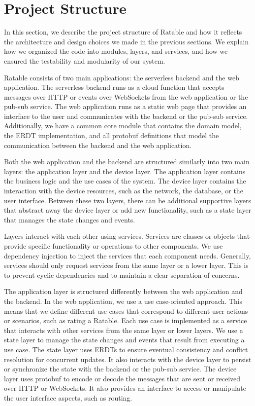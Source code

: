 \documentclass[
	english,
	ruledheaders=section,   %
	class=report,		    %
	thesis={type=bachelor}, %
	accentcolor=9c,			%
	custommargins=true,    %
	marginpar=false,        %
	parskip=half-,          %
	fontsize=11pt,          %
]{tudapub}
\begin{document}
\section{Project Structure}
In this section, we describe the project structure of Ratable and how it reflects the architecture and design choices we made in the previous sections. We explain how we organized the code into modules, layers, and services, and how we ensured the testability and modularity of our system.

Ratable consists of two main applications: the serverless backend and the web application. The serverless backend runs as a cloud function that accepts messages over HTTP or events over WebSockets from the web application or the pub-sub service. The web application runs as a static web page that provides an interface to the user and communicates with the backend or the pub-sub service. Additionally, we have a common core module that contains the domain model, the ERDT implementation, and all protobuf definitions that model the communication between the backend and the web application.

Both the web application and the backend are structured similarly into two main layers: the application layer and the device layer. The application layer contains the business logic and the use cases of the system. The device layer contains the interaction with the device resources, such as the network, the database, or the user interface. Between these two layers, there can be additional supportive layers that abstract away the device layer or add new functionality, such as a state layer that manages the state changes and events.

Layers interact with each other using services. Services are classes or objects that provide specific functionality or operations to other components. We use dependency injection to inject the services that each component needs. Generally, services should only request services from the same layer or a lower layer. This is to prevent cyclic dependencies and to maintain a clear separation of concerns.

The application layer is structured differently between the web application and the backend. In the web application, we use a use case-oriented approach. This means that we define different use cases that correspond to different user actions or scenarios, such as rating a Ratable. Each use case is implemented as a service that interacts with other services from the same layer or lower layers. We use a state layer to manage the state changes and events that result from executing a use case. The state layer uses ERDTs to ensure eventual consistency and conflict resolution for concurrent updates. It also interacts with the device layer to persist or synchronize the state with the backend or the pub-sub service. The device layer uses protobuf to encode or decode the messages that are sent or received over HTTP or WebSockets. It also provides an interface to access or manipulate the user interface aspects, such as routing.
\end{document}

